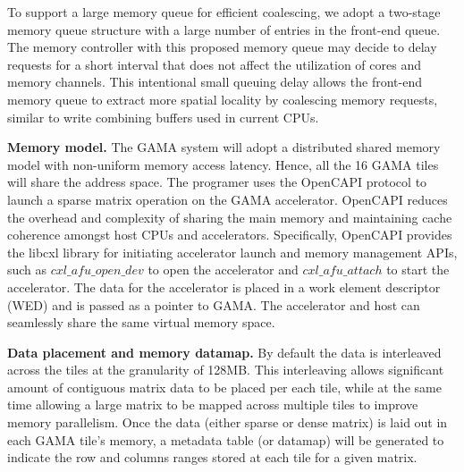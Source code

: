 To support a large memory queue for efficient coalescing, 
we adopt a two-stage memory queue structure with a large number of entries in the front-end queue. 
The memory controller with this proposed  memory queue may decide to delay requests for a short interval that does not affect the utilization of cores and memory channels. 
This intentional small queuing delay allows the front-end memory queue to extract more spatial locality by coalescing memory requests, similar to write combining buffers used in current CPUs.  

\vspace{3pt}
\noindent
\textbf{Memory model.} 
The GAMA system will adopt a distributed shared memory model with non-uniform memory access latency. 
Hence, all the 16 GAMA tiles will share the address space. 
The programer uses the OpenCAPI protocol to launch a sparse matrix operation on the GAMA accelerator. 
OpenCAPI reduces the overhead and complexity of sharing the main memory and maintaining cache coherence amongst host CPUs and accelerators.
Specifically, OpenCAPI provides the libcxl library for initiating accelerator launch and memory management APIs, such as $cxl\_afu\_open\_dev$ to open the accelerator and $cxl\_afu\_attach$ to start the accelerator. 
The data for the accelerator is placed in a work element descriptor (WED) and is passed as a pointer to GAMA. 
The accelerator and host can seamlessly share the same virtual memory space. 


\vspace{3pt}
\noindent
\textbf{Data placement and memory datamap.} 
By default the data is interleaved across the tiles at the granularity of 128MB. 
This interleaving allows significant amount of contiguous matrix data to be placed per each tile, while at the same time allowing a large matrix to be mapped across multiple tiles to improve memory parallelism.   
Once the data (either sparse or dense matrix) is laid out in each GAMA tile's memory, 
a metadata table (or datamap) will be generated to indicate the row and columns ranges stored at each tile for a given matrix.   

